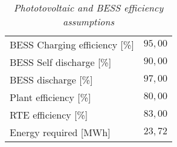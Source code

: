 \begin{table}[h!]
\centering
\begin{tabular}{|lc|}
\hline
\rowcolor{bluepoli!40}\multicolumn{2}{|c|}{\textbf{Efficiency assumptions}}                    \\ \hline
\multicolumn{1}{|l|}{BESS Charging efficiency [\%]}   & \textbf{$95,00$}                          \\ \hline
\multicolumn{1}{|l|}{BESS Self discharge [\%]}        & \textbf{$90,00$}                          \\ \hline
\multicolumn{1}{|l|}{BESS discharge [\%]}             & \textbf{$97,00$}                          \\ \hline
\multicolumn{1}{|l|}{Plant efficiency [\%]}           & \textbf{$80,00$}                          \\ \hline
\multicolumn{1}{|l|}{RTE efficiency [\%]}             & \textbf{$83,00$}                          \\ \hline
\multicolumn{1}{|l|}{Energy required {[}MWh{]}}       & \textbf{$23,72$}                       \\ \hline
\end{tabular}
\caption{\textit{Phototovoltaic and BESS efficiency assumptions\textsuperscript{\cite{guanda20211, EnelGreenPower2021PhotovoltaicModule, enelx}}}}
\label{tab:pvbessass}
\end{table}